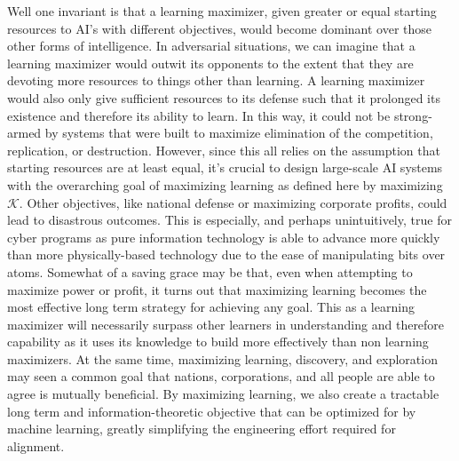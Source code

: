 \documentclass{article}
\begin{document}
Well one invariant is that a learning maximizer, given greater or equal starting resources to AI's with different objectives, would become dominant over those other forms of intelligence. In adversarial situations, we can imagine that a learning maximizer would outwit its opponents to the extent that they are devoting more resources to things other than learning. A learning maximizer would also only give sufficient resources to its defense such that it prolonged its existence and therefore its ability to learn. In this way, it could not be strong-armed by systems that were built to maximize elimination of the competition, replication, or destruction. However, since this all relies on the assumption that starting resources are at least equal, it's crucial to design large-scale AI systems with the overarching goal of maximizing learning as defined here by maximizing $\mathcal{K}$. Other objectives, like national defense or maximizing corporate profits, could lead to disastrous outcomes. This is especially, and perhaps unintuitively, true for cyber programs as pure information technology is able to advance more quickly than more physically-based technology due to the ease of manipulating bits over atoms. Somewhat of a saving grace may be that, even when attempting to maximize power or profit, it turns out that maximizing learning becomes the most effective long term strategy for achieving any goal. This as a learning maximizer will necessarily surpass other learners in understanding and therefore capability as it uses its knowledge to build more effectively than non learning maximizers. At the same time, maximizing learning, discovery, and exploration may seen a common goal that nations, corporations, and all people are able to agree is mutually beneficial. By maximizing learning, we also create a tractable long term and information-theoretic objective that can be optimized for by machine learning, greatly simplifying the engineering effort required for alignment.
\end{document}
